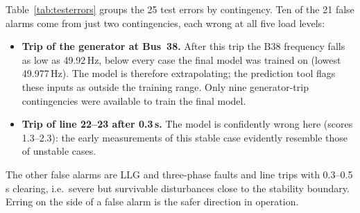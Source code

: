 \documentclass[11pt,a4paper]{article}
\begin{document}
Table~\ref{tab:testerrors} groups the 25 test errors by contingency. Ten of the 21 false alarms come from just two
contingencies, each wrong at all five load levels:
\begin{itemize}
  \item \textbf{Trip of the generator at Bus~38.} After this trip the B38 frequency falls as low as 49.92\,Hz, below
        every case the final model was trained on (lowest 49.977\,Hz). The model is therefore extrapolating; the
        prediction tool flags these inputs as outside the training range. Only nine generator-trip contingencies were
        available to train the final model.
  \item \textbf{Trip of line 22--23 after 0.3\,s.} The model is confidently wrong here (scores 1.3--2.3): the early
        measurements of this stable case evidently resemble those of unstable cases.
\end{itemize}
The other false alarms are LLG and three-phase faults and line trips with 0.3--0.5\,s clearing, i.e.\ severe but
survivable disturbances close to the stability boundary. Erring on the side of a false alarm is the safer direction in
operation.
\end{document}
